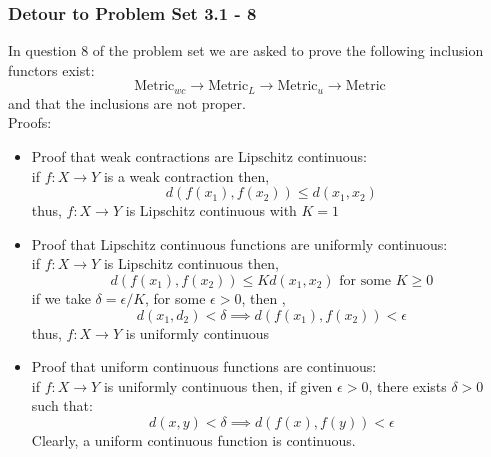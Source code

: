 \begin{frame}
    \frametitle{Detour to Problem Set 3.1 - 8}
    In question 8 of the problem set we are asked to prove the following inclusion functors exist:
    \begin{equation*}
        \text{Metric}_{wc} \rightarrow \text{Metric}_L \rightarrow \text{Metric}_u \rightarrow \text{Metric}
    \end{equation*}
    and that the inclusions are not proper.\\

    Proofs:
    \begin{itemize}
        \item Proof that weak contractions are Lipschitz continuous:\\
            if \(f:X\rightarrow Y\) is a weak contraction then, 
            \begin{equation*}
                d(f(x_1),f(x_2))\leq d(x_1,x_2)
            \end{equation*}
            thus, \(f:X\rightarrow Y\) is Lipschitz continuous with \(K=1\)
    \end{itemize}
\end{frame}

\begin{frame}
    \begin{itemize}
        \item Proof that Lipschitz continuous functions are uniformly continuous:\\
            if \(f:X\rightarrow Y\) is Lipschitz continuous then,
            \begin{equation*}
                d(f(x_1),f(x_2))\leq Kd(x_1,x_2)\text{ for some }K\geq 0
            \end{equation*}
            if we take \(\delta = \epsilon/K\), for some \(\epsilon>0\), then , 
            \begin{equation*}
                d(x_1,d_2)<\delta \implies d(f(x_1),f(x_2))<\epsilon
            \end{equation*}
            thus, \(f:X\rightarrow Y \) is uniformly continuous
        \item Proof that uniform continuous functions are continuous:\\
            if \(f:X\rightarrow Y\) is uniformly continuous then, if given \(\epsilon > 0\), there exists \(\delta>0\) such that:
            \begin{equation*}
                d(x,y)<\delta \implies d(f(x),f(y))<\epsilon
            \end{equation*}
            Clearly, a uniform continuous function is continuous.
    \end{itemize}
\end{frame}

